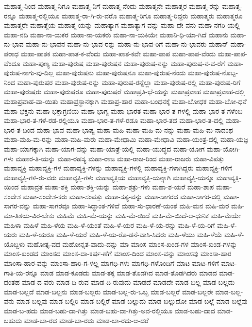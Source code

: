 {ಮಹಾತ್ಮ-ನಿಂದ
ಮಹಾತ್ಮ-ನಿಗೂ
ಮಹಾತ್ಮ-ನಿಗೆ
ಮಹಾತ್ಮ-ನೆಂದು
ಮಹಾತ್ಮನೇ
ಮಹಾತ್ಮರ
ಮಹಾತ್ಮ-ರನ್ನು
ಮಹಾತ್ಮ-ರನ್ನೂ
ಮಹಾತ್ಮ-ರಲ್ಲಿಯೂ
ಮಹಾತ್ಮ-ರಾ-ಗಿ-ರು-ವರೊ
ಮಹಾತ್ಮ-ರಿಗೂ
ಮಹಾತ್ಮ-ರಿದ್ದರು
ಮಹಾತ್ಮರು
ಮಹಾತ್ಮರೂ
ಮಹಾತ್ಮರೇ
ಮಹಾತ್ಮೆಯ
ಮಹಾತ್ಮೆ-ಯನ್ನು
ಮಹಾತ್ಯಾಗ
ಮಹಾತ್ಯಾಗ-ವನ್ನು
ಮಹಾ-ದೇ-ವನು
ಮಹಾ-ನಗರಿ-ಯಲ್ಲಿ
ಮಹಾ-ನದಿ
ಮಹಾ-ನಾ-ಯಕರ
ಮಹಾ-ನಾ-ಯಕರು
ಮಹಾ-ನಾ-ಯಕಿಯೇ
ಮಹಾನಿ-ಧಿ-ಯಾ-ಗಿದೆ
ಮಹಾನು
ಮಹಾ-ನು-ಭಾವ
ಮಹಾ-ನು-ಭಾವನ
ಮಹಾ-ನು-ಭಾವ-ರನ್ನು
ಮಹಾ-ನು-ಭಾವ-ರಿಗೆ
ಮಹಾ-ನು-ಭಾವರು
ಮಹಾನ್
ಮಹಾ-ಪರಾಧ
ಮಹಾ-ಪಾತಕ
ಮಹಾ-ಪಾತ-ಕ-ವೆಂದು
ಮಹಾ-ಪಾತ-ಕವೇ
ಮಹಾ-ಪಾಪ
ಮಹಾ-ಪಾಪ-ವೆಂದು
ಮಹಾ-ಪಾಪ-ವೆಂದೂ
ಮಹಾ-ಪುಣ್ಯ
ಮಹಾ-ಪುರುಷ
ಮಹಾ-ಪುರುಷನ
ಮಹಾ-ಪುರುಷ-ನನ್ನು
ಮಹಾ-ಪುರುಷ-ನ-ವ-ರೆಗೆ
ಮಹಾ-ಪುರುಷ-ನಾಗು-ವು-ದಿಲ್ಲ
ಮಹಾ-ಪುರುಷನು
ಮಹಾ-ಪುರುಷನೂ
ಮಹಾ-ಪುರುಷ-ನೆಂದು
ಮಹಾ-ಪುರುಷ-ನೊಬ್ಬ-ನಿಂದ
ಮಹಾ-ಪುರುಷರ
ಮಹಾ-ಪುರುಷ-ರನ್ನು
ಮಹಾ-ಪುರುಷ-ರನ್ನೆಲ್ಲಾ
ಮಹಾ-ಪುರುಷ-ರಲ್ಲಿ
ಮಹಾ-ಪುರುಷ-ರಿಗೆ
ಮಹಾ-ಪುರುಷರು
ಮಹಾ-ಪುರುಷರೂ
ಮಹಾ-ಪುರುಷರೆ
ಮಹಾಪ್ರತಿ-ಭೆ-ಯನ್ನು
ಮಹಾಪ್ರವಾಹ
ಮಹಾಪ್ರವಾಹ-ದಲ್ಲಿ
ಮಹಾಪ್ರವಾಹ-ವಾ-ಯಿತು
ಮಹಾಪ್ರಸ್ಥಾನಕ್ಕಾಗಿ
ಮಹಾಪ್ರ-ಹಾರ
ಮಹಾ-ಬಂಧನಕ್ಕೆ
ಮಹಾ-ಬೋಧಕ
ಮಹಾ-ಬೋ-ಧನೆ
ಮಹಾ-ಭಕ್ತನು
ಮಹಾ-ಭಕ್ತಾಗ್ರಣಿಯ
ಮಹಾ-ಭಾಗ್ಯ
ಮಹಾ-ಭಾರತ
ಮಹಾ-ಭಾರ-ತ-ಗಳಲ್ಲಿ
ಮಹಾ-ಭಾರ-ತ-ಗಳೆಂಬ
ಮಹಾ-ಭಾರ-ತ-ಗಳೆ-ರಡ-ರಲ್ಲಿಯೂ
ಮಹಾ-ಭಾರ-ತ-ಗಳೆ-ರಡೂ
ಮಹಾ-ಭಾರ-ತದ
ಮಹಾ-ಭಾರ-ತ-ದಲ್ಲಿ
ಮಹಾ-ಭಾರ-ತ-ದಿಂದ
ಮಹಾ-ಭಾವ
ಮಹಾ-ಭಾಷ್ಯ
ಮಹಾ-ಮಹಿ
ಮಹಾ-ಮಹಿ-ಮ-ನನ್ನು
ಮಹಾ-ಮಹಿ-ಮ-ನಾದಂಥ
ಮಹಾ-ಮಹಿ-ಮ-ರನ್ನು
ಮಹಾ-ಮಹಿ-ಮರು
ಮಹಾ-ಮೇಧಾಮಿ
ಮಹಾ-ಮೇಧಾವಿ
ಮಹಾ-ಯಂತ್ರ-ದಲ್ಲಿ
ಮಹಾ-ಯಜ್ಞ
ಮಹಾ-ಯಾಗಕ್ಕಾಗಿ
ಮಹಾ-ಯಾಗ-ವನ್ನು
ಮಹಾ-ಯಾತ್ರೆ-ಯಲ್ಲಿ
ಮಹಾ-ಯುದ್ಧದ
ಮಹಾ-ಯೋಗ
ಮಹಾ-ಯೋಗಿ-ಗಳು
ಮಹಾರ-ತಿ-ಯನ್ನು
ಮಹಾ-ರಹಸ್ಯ
ಮಹಾ-ರಾಜ
ಮಹಾ-ರಾಜ-ರಿಂದ
ಮಹಾ-ರಾಜರು
ಮಹಾ-ವಿಪತ್ತು
ಮಹಾವ್ಯಕ್ತಿ
ಮಹಾವ್ಯಕ್ತಿ-ಗಳ
ಮಹಾವ್ಯಕ್ತಿ-ಗಳನ್ನು
ಮಹಾವ್ಯಕ್ತಿ-ಗಳಲ್ಲಿ
ಮಹಾವ್ಯಕ್ತಿ-ಗಳಾಗಿದ್ದರು
ಮಹಾವ್ಯಕ್ತಿ-ಗಳಿಗೆ
ಮಹಾವ್ಯಕ್ತಿ-ಗಳಿ-ರು-ವರು
ಮಹಾವ್ಯಕ್ತಿ-ಗಳು
ಮಹಾವ್ಯಕ್ತಿಯ
ಮಹಾವ್ಯಕ್ತಿ-ಯನ್ನಾಗಿ
ಮಹಾವ್ಯಕ್ತಿ-ಯನ್ನೂ
ಮಹಾವ್ಯಕ್ತಿ-ಯಿಂದ
ಮಹಾವ್ರತ
ಮಹಾ-ಶಕ್ತಿ
ಮಹಾ-ಶಕ್ತಿ-ಯನ್ನು
ಮಹಾ-ಶತ್ರು-ಗಳು
ಮಹಾ-ಶ-ಯರೆ
ಮಹಾ-ಶಾಪ
ಮಹಾ-ಸಂದೇಶ
ಮಹಾ-ಸಂದೇಶ-ಕರು
ಮಹಾ-ಸಂಪತ್ತು
ಮಹಾ-ಸತ್ಯ-ವನ್ನು
ಮಹಾ-ಸಾಗರದ
ಮಹಾ-ಸಾಗರ-ದಲ್ಲಿ
ಮಹಾ-ಸಾಗರ-ವನ್ನು
ಮಹಾ-ಸಾಗರವೂ
ಮಹಾ-ಸಿದ್ಧಾಂತ-ಗಳಿವೆ
ಮಹಾ-ಸು-ಧಾರಣೆ-ಯಂತೆ
ಮಹಿ-ಮನ
ಮಹಿ-ಮರ
ಮಹಿ-ಮಾ-ತಿಶಯ-ವಿರ-ಬೇಕು
ಮಹಿಮೆ
ಮಹಿ-ಮೆ-ಯನ್ನು
ಮಹಿ-ಮೆ-ಯಿದೆ
ಮಹಿ-ಮೆ-ಯಿದೆ-ಆ-ಧುನಿಕ
ಮಹಿ-ಮೆಯೇ
ಮಹಿಳಾ
ಮಹಿಳೆ
ಮಹಿ-ಳೆಯ
ಮಹಿ-ಳೆ-ಯಂತೆ
ಮಹಿ-ಳೆ-ಯರ
ಮಹಿ-ಳೆ-ಯ-ರನ್ನು
ಮಹಿ-ಳೆ-ಯ-ರಿಗೆ
ಮಹಿ-ಳೆ-ಯರು
ಮಹಿ-ಳೆ-ಯರೂ
ಮಹಿ-ಳೆ-ಯರೆ
ಮಹಿ-ಳೆ-ಯ-ರೊ-ಡನೆ-ವಾಸಿ-ಸಿದರು
ಮಹಿ-ಳೆಯು
ಮಹಿ-ಳೆಯೆ
ಮಹಿ-ಳೆ-ಯೊಬ್ಬಳು
ಮಹೋತ್ಸ-ವದ
ಮಹೋನ್ನತ-ವಾದು-ದನ್ನು
ಮಾ
ಮಾಂಸ
ಮಾಂಸ-ಖಂಡ-ಗಳ
ಮಾಂಸ-ಖಂಡ-ಗಳನ್ನು
ಮಾಂಸ-ಖಂಡದ
ಮಾಂಸದ
ಮಾಂಸ-ದಾ-ಕರ್ಷ-ಣೆಗೆ
ಮಾಂಸ-ದಿಂದ
ಮಾಂಸ-ವನ್ನು
ಮಾಂಸವು
ಮಾಂಸಾ-ಹಾರ
ಮಾಂಸಾ-ಹಾರ-ವನ್ನು
ಮಾಂಸಾ-ಹಾರಿ-ಗ-ಳಲ್ಲ
ಮಾಗಧಿ-ಗಳು
ಮಾಗಧಿ-ಗಳೊಂದಿಗೆ
ಮಾಟ
ಮಾಟ-ಗಳಿಗೆ
ಮಾಟ-ಗಾತಿ-ಯ-ರನ್ನೂ
ಮಾಡ
ಮಾಡ-ಕೂಡದು
ಮಾಡ-ತಕ್ಕ
ಮಾಡ-ತೊಡಗಿದ
ಮಾಡ-ತೊಡಗಿದರು
ಮಾಡದ
ಮಾಡ-ದಂತಹ
ಮಾಡ-ದ-ವರು
ಮಾಡ-ದಿ-ರುವ
ಮಾಡ-ದಿ-ರುವುದು
ಮಾಡದೆ
ಮಾಡದೇ
ಮಾಡ-ಬಲ್ಲ
ಮಾಡ-ಬಲ್ಲದು
ಮಾಡ-ಬಲ್ಲದೆ
ಮಾಡ-ಬಲ್ಲನು
ಮಾಡ-ಬಲ್ಲರು
ಮಾಡ-ಬಲ್ಲ-ರು-ಒಬ್ಬ
ಮಾಡ-ಬಲ್ಲರೆ
ಮಾಡ-ಬಲ್ಲರೇ
ಮಾಡ-ಬಲ್ಲ-ವನು
ಮಾಡ-ಬಲ್ಲವು
ಮಾಡ-ಬಲ್ಲಿರಿ
ಮಾಡ-ಬಲ್ಲಿರೆ
ಮಾಡ-ಬಲ್ಲುದು
ಮಾಡ-ಬಲ್ಲುದೋ
ಮಾಡ-ಬಲ್ಲೆ
ಮಾಡ-ಬಲ್ಲೆವು
ಮಾಡ-ಬ-ಹದು
ಮಾಡ-ಬಹು-ದಾ-ಗಿತ್ತು
ಮಾಡ-ಬಹು-ದಾ-ಗಿತ್ತು-ಅವ-ರಲ್ಲಿಯೂ
ಮಾಡ-ಬಹು-ದಾದ
ಮಾಡ-ಬಹುದು
ಮಾಡ-ಬಾ-ರದ
ಮಾಡ-ಬಾ-ರದು
ಮಾಡ-ಬಾ-ರದು-ಆ-ದರೆ
}

